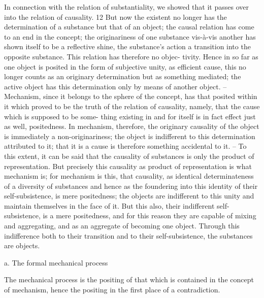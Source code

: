 In connection with the relation of substantiality, we showed that it passes
over into the relation of causality. 12 But now the existent no longer has the
determination of a substance but that of an object; the causal relation has
come to an end in the concept; the originariness of one substance vis-à-vis
another has shown itself to be a reflective shine, the substance's action a
transition into the opposite substance. This relation has therefore no objec-
tivity. Hence in so far as one object is posited in the form of subjective
unity, as efficient cause, this no longer counts as an originary determination
but as something mediated; the active object has this determination only
by means of another object. – Mechanism, since it belongs to the sphere of
the concept, has that posited within it which proved to be the truth of the
relation of causality, namely, that the cause which is supposed to be some-
thing existing in and for itself is in fact effect just as well, positedness. In
mechanism, therefore, the originary causality of the object is immediately a
non-originariness; the object is indifferent to this determination attributed
to it; that it is a cause is therefore something accidental to it. – To this
extent, it can be said that the causality of substances is only the product
of representation. But precisely this causality as product of representation
is what mechanism is; for mechanism is this, that causality, as identical
determinateness of a diversity of substances and hence as the foundering
into this identity of their self-subsistence, is mere positedness; the objects
are indifferent to this unity and maintain themselves in the face of it. But
this also, their indifferent self-subsistence, is a mere positedness, and for this
reason they are capable of mixing and aggregating, and as an aggregate of
becoming one object. Through this indifference both to their transition and
to their self-subsistence, the substances are objects.

a. The formal mechanical process

The mechanical process is the positing of that which is contained in
the concept of mechanism,
hence the positing in the first place of a contradiction.

